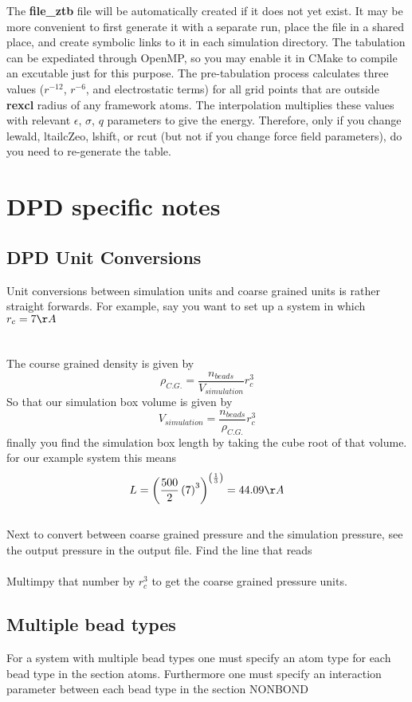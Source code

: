 \documentclass[12pt,letterpaper]{article}
\begin{document}
The \textbf{file\_ztb} file will be automatically created if
it does not yet exist. It may be more convenient to first
generate it with a separate run, place the file in a shared
place, and create symbolic links to it in each simulation
directory. The tabulation can be expediated through OpenMP,
so you may enable it in CMake to compile an excutable just
for this purpose. The pre-tabulation process calculates
three values ($r^{-12}$, $r^{-6}$, and electrostatic terms)
for all grid points that are outside \textbf{rexcl} radius
of any framework atoms. The interpolation multiplies these
values with relevant $\epsilon$, $\sigma$, $q$ parameters to
give the energy. Therefore, only if you change lewald,
ltailcZeo, lshift, or rcut (but not if you change force
field parameters), do you need to re-generate the table.
\section{DPD specific notes} \label{sec:dpdunitconversions}
\subsection{DPD Unit Conversions} 
Unit conversions between simulation units and coarse grained 
units is rather straight forwards. For example, say you want 
to set up a system in which \\ \indent $r_c = 7 \AA$ 
\\  
\\  
\\ The course grained density is given by 
\begin{equation}
\rho_{C.G.} = \frac{n_{beads}}{V_{simulation}}r_c^{3}
\end{equation}
So that our simulation box volume is given by 
\begin{equation}
V_{simulation}  = \frac{n_{beads}}{\rho_{C.G.}} r_c^3
\end{equation}
finally you find the simulation box length by taking the cube root of that volume. \\ for our example system this means
\begin{equation}
L = \left(\frac{500}{2}\left(7\right)^3\right)^{\left(\frac{1}{3}\right)}=44.09\AA
\end{equation}
\\ \indent Next to convert between coarse grained pressure and the simulation pressure, see the output pressure in the output file. Find the line that reads \\  \\ Multimpy that number by $r_c^3$ to get the coarse grained pressure units. 
\subsection{Multiple bead types}
For a system with multiple bead types one must specify an atom type for each bead type in the section atoms. Furthermore one must specify an interaction parameter between each bead type in the section NONBOND
\end{document}
